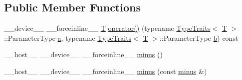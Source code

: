 \subsection*{Public Member Functions}
\begin{DoxyCompactItemize}
\item 
\-\_\-\-\_\-device\-\_\-\-\_\- \-\_\-\-\_\-forceinline\-\_\-\-\_\- \hyperlink{calib3d_8hpp_a3efb9551a871ddd0463079a808916717}{T} \hyperlink{structcv_1_1gpu_1_1device_1_1minus_a4b8f0ef70b467753d77041009afa6154}{operator()} (typename \hyperlink{structcv_1_1gpu_1_1device_1_1TypeTraits}{Type\-Traits}$<$ \hyperlink{calib3d_8hpp_a3efb9551a871ddd0463079a808916717}{T} $>$\-::Parameter\-Type \hyperlink{legacy_8hpp_a1031d0e0a97a340abfe0a6ab9e831045}{a}, typename \hyperlink{structcv_1_1gpu_1_1device_1_1TypeTraits}{Type\-Traits}$<$ \hyperlink{calib3d_8hpp_a3efb9551a871ddd0463079a808916717}{T} $>$\-::Parameter\-Type \hyperlink{legacy_8hpp_ac04272e8ca865b8fba18d36edae9fd2a}{b}) const 
\item 
\-\_\-\-\_\-host\-\_\-\-\_\- \-\_\-\-\_\-device\-\_\-\-\_\- \-\_\-\-\_\-forceinline\-\_\-\-\_\- \hyperlink{structcv_1_1gpu_1_1device_1_1minus_ab52dd14d6690c570e3f347cfcfe5e803}{minus} ()
\item 
\-\_\-\-\_\-host\-\_\-\-\_\- \-\_\-\-\_\-device\-\_\-\-\_\- \-\_\-\-\_\-forceinline\-\_\-\-\_\- \hyperlink{structcv_1_1gpu_1_1device_1_1minus_ab238dd231b97baca04365172617d9a54}{minus} (const \hyperlink{structcv_1_1gpu_1_1device_1_1minus}{minus} \&)
\end{DoxyCompactItemize}



